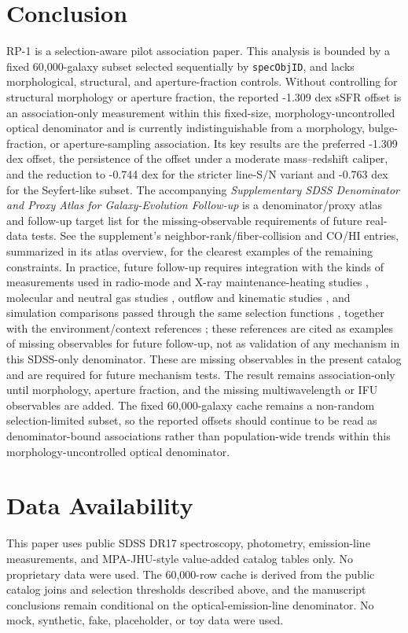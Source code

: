 \documentclass[twocolumn]{aastex631}
\begin{document}
\section{Conclusion}
RP-1 is a selection-aware pilot association paper. This analysis is bounded by a fixed 60,000-galaxy subset selected sequentially by \texttt{specObjID}, and lacks morphological, structural, and aperture-fraction controls. Without controlling for structural morphology or aperture fraction, the reported -1.309 dex sSFR offset is an association-only measurement within this fixed-size, morphology-uncontrolled optical denominator and is currently indistinguishable from a morphology, bulge-fraction, or aperture-sampling association. Its key results are the preferred -1.309 dex offset, the persistence of the offset under a moderate mass--redshift caliper, and the reduction to -0.744 dex for the stricter line-S/N variant and -0.763 dex for the Seyfert-like subset. The accompanying \emph{Supplementary SDSS Denominator and Proxy Atlas for Galaxy-Evolution Follow-up} is a denominator/proxy atlas and follow-up target list for the missing-observable requirements of future real-data tests. See the supplement's neighbor-rank/fiber-collision and CO/HI entries, summarized in its atlas overview, for the clearest examples of the remaining constraints.
In practice, future follow-up requires integration with the kinds of measurements used in radio-mode and X-ray maintenance-heating studies \citep{best2005,fabian2012,mcnamara2007,heckmanbest2014,lamassa2013}, molecular and neutral gas studies \citep{xcoldgass2017,xgass2018}, outflow and kinematic studies \citep{veilleux2005,cicone2014,carniani2017,fiore2017}, and simulation comparisons passed through the same selection functions \citep{simba2019,tng2019,eagle2015}, together with the environment/context references \citep{peng2010,ellison2011,piotrowska2022,wetzel2013,dekel2006}; these references are cited as examples of missing observables for future follow-up, not as validation of any mechanism in this SDSS-only denominator. These are missing observables in the present catalog and are required for future mechanism tests. The result remains association-only until morphology, aperture fraction, and the missing multiwavelength or IFU observables are added. The fixed 60,000-galaxy cache remains a non-random selection-limited subset, so the reported offsets should continue to be read as denominator-bound associations rather than population-wide trends within this morphology-uncontrolled optical denominator.

\section*{Data Availability}
This paper uses public SDSS DR17 spectroscopy, photometry, emission-line measurements, and MPA-JHU-style value-added catalog tables only. No proprietary data were used. The 60,000-row cache is derived from the public catalog joins and selection thresholds described above, and the manuscript conclusions remain conditional on the optical-emission-line denominator. No mock, synthetic, fake, placeholder, or toy data were used.
\end{document}
